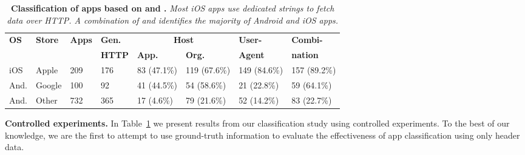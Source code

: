 \begin{table} 
     \centering
     \begin{small}
     \begin{tabular}{|p{}|p{}|p{}|p{}|p{}|p{}|p{}|p{}|}
        \hline
        {\bf OS}&{\bf Store}&{\bf Apps}&{\bf Gen.}&\multicolumn{2}{|c|}{\bf Host} & {\bf User-}&{\bf Combi-} \tabularnewline
        \cline{5-6}    
             &        &     & {\bf HTTP} & {\bf App. } & {\bf Org.}& \bf{Agent}   & \bf{nation}  \tabularnewline                
        \hline    
        iOS  & Apple  & 209 & 176 & 83 (47.1\%)  &  119 (67.6\%)   &  149 (84.6\%)& 157 (89.2\%) \tabularnewline
        \hline
        And. & Google & 100 & 92  & 41 (44.5\%)  &  54 (58.6\%)    &  21 (22.8\%) &  59 (64.1\%)  \tabularnewline
        \hline    
        And. & Other  & 732 &  365 &  17 (4.6\%) &  79 (21.6\%)    &  52 (14.2\%)  & 83 (22.7\%)  \tabularnewline
        \hline
     \end{tabular}
     \end{small}
     \caption{\textbf{Classification of apps based on \httphost and \useragent.} \emph{ Most iOS apps use dedicated \useragent strings to fetch data over HTTP. A combination of \useragent and \httphost identifies the majority of Android and iOS apps.}}
     \label{tab:classification-success}
\vspace{\postfigspace}
\end{table}



\noindent\textbf{Controlled experiments.}
In Table~\ref{tab:classification-success} we present results from our classification study using controlled experiments. To 
the best of our knowledge, we are the first to attempt to use ground-truth information to evaluate the 
effectiveness of app classification using only header data. 

